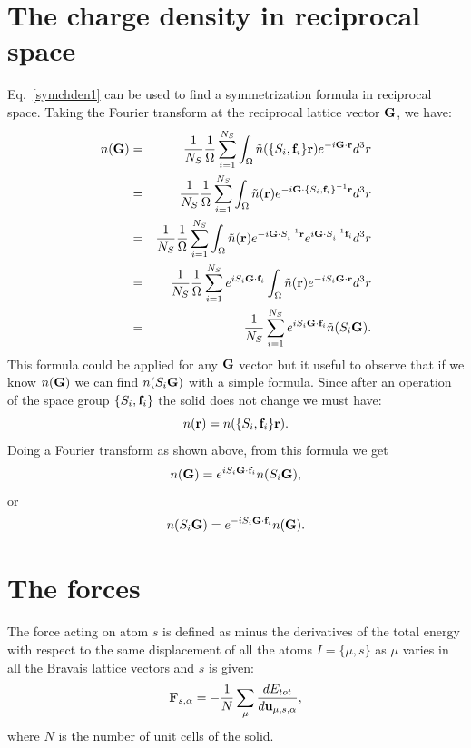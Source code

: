 \documentclass[12pt,a4paper,twoside]{report}
\begin{document}
\section{The charge density in reciprocal space}
Eq.~\ref{symchden1} can be used to find a symmetrization formula in reciprocal space. Taking the Fourier transform at the reciprocal lattice vector ${\bf G}$, we have:
\begin{eqnarray}
n({\bf G}) &=& {1\over N_S} {1\over \Omega}
\sum_{i=1}^{N_S} \int_{\Omega} \tilde n ( \{S_i,{\bf f}_i\} {\bf r}) e^{-i{\bf G} \cdot {\bf r}} d^3r\nonumber \\
&=&{1\over N_S} {1\over \Omega}
\sum_{i=1}^{N_S} \int_{\Omega} \tilde n ({\bf r}) e^{-i{\bf G} \cdot \{S_i,{\bf f}_i\}^{-1}{\bf r}} d^3r \nonumber \\
&=&{1\over N_S} {1\over \Omega}
\sum_{i=1}^{N_S} \int_{\Omega} \tilde n ({\bf r}) e^{-i{\bf G} \cdot S_i^{-1}{\bf r}} e^{i{\bf G} \cdot S_i^{-1}{\bf f}_i} d^3r \nonumber \\
&=&{1\over N_S} {1\over \Omega}
\sum_{i=1}^{N_S} e^{iS_i {\bf G} \cdot {\bf f}_i} \int_{\Omega} \tilde n ({\bf r}) e^{-iS_i {\bf G} \cdot {\bf r}} d^3r \nonumber \\
&=&{1\over N_S}
\sum_{i=1}^{N_S} e^{iS_i {\bf G} \cdot {\bf f}_i}  \tilde n (S_i{\bf G}). 
\label{symng}
\end{eqnarray}
This formula could be applied for any ${\bf G}$ vector but it useful to observe that if we know $n({\bf G})$ we can find
$n(S_i{\bf G})$ with a simple formula.
Since after an operation of the space group $\{S_i,{\bf f}_i\}$ the solid does not change we must have:
\begin{equation}
n({\bf r})=n(\{S_i,{\bf f}_i\}{\bf r}).
\end{equation}
Doing a Fourier transform as shown above, from this formula we get
\begin{equation}
 n({\bf G})= e^{iS_i {\bf G} \cdot {\bf f}_i} n (S_i{\bf G}), 
\end{equation}
or 
\begin{equation}
 n(S_i{\bf G})= e^{-iS_i {\bf G} \cdot {\bf f}_i} n ({\bf G}). 
 \label{ngdist}
\end{equation}

\section{The forces}

The force acting on atom $s$ is defined as minus the derivatives of the 
total energy with respect to the same displacement of all the atoms
$I=\{\mu,s\}$ as $\mu$ varies in all the Bravais lattice vectors and
$s$ is given:
\begin{equation}
{\bf F}_{s,\alpha} = -{1\over N} \sum_\mu {d E_{tot} \over d 
{\bf u}_{\mu, s,\alpha}},
\end{equation}
where $N$ is the number of unit cells of the solid.
\end{document}
